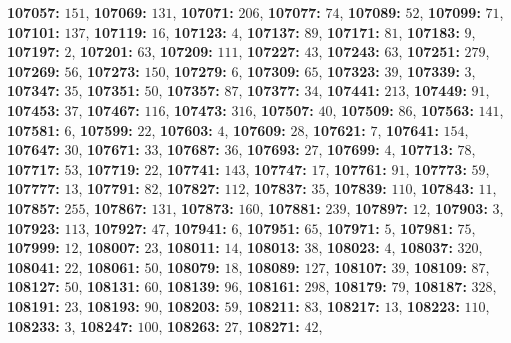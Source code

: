 \textsf{\bfseries 107057:} $151$, \textsf{\bfseries 107069:} $131$, \textsf{\bfseries 107071:} $206$, \textsf{\bfseries 107077:} $74$, \textsf{\bfseries 107089:} $52$, \textsf{\bfseries 107099:} $71$, \textsf{\bfseries 107101:} $137$, \textsf{\bfseries 107119:} $16$, \textsf{\bfseries 107123:} $4$, \textsf{\bfseries 107137:} $89$, \textsf{\bfseries 107171:} $81$, \textsf{\bfseries 107183:} $9$, \textsf{\bfseries 107197:} $2$, \textsf{\bfseries 107201:} $63$, \textsf{\bfseries 107209:} $111$, \textsf{\bfseries 107227:} $43$, \textsf{\bfseries 107243:} $63$, \textsf{\bfseries 107251:} $279$, \textsf{\bfseries 107269:} $56$, \textsf{\bfseries 107273:} $150$, \textsf{\bfseries 107279:} $6$, \textsf{\bfseries 107309:} $65$, \textsf{\bfseries 107323:} $39$, \textsf{\bfseries 107339:} $3$, \textsf{\bfseries 107347:} $35$, \textsf{\bfseries 107351:} $50$, \textsf{\bfseries 107357:} $87$, \textsf{\bfseries 107377:} $34$, \textsf{\bfseries 107441:} $213$, \textsf{\bfseries 107449:} $91$, \textsf{\bfseries 107453:} $37$, \textsf{\bfseries 107467:} $116$, \textsf{\bfseries 107473:} $316$, \textsf{\bfseries 107507:} $40$, \textsf{\bfseries 107509:} $86$, \textsf{\bfseries 107563:} $141$, \textsf{\bfseries 107581:} $6$, \textsf{\bfseries 107599:} $22$, \textsf{\bfseries 107603:} $4$, \textsf{\bfseries 107609:} $28$, \textsf{\bfseries 107621:} $7$, \textsf{\bfseries 107641:} $154$, \textsf{\bfseries 107647:} $30$, \textsf{\bfseries 107671:} $33$, \textsf{\bfseries 107687:} $36$, \textsf{\bfseries 107693:} $27$, \textsf{\bfseries 107699:} $4$, \textsf{\bfseries 107713:} $78$, \textsf{\bfseries 107717:} $53$, \textsf{\bfseries 107719:} $22$, \textsf{\bfseries 107741:} $143$, \textsf{\bfseries 107747:} $17$, \textsf{\bfseries 107761:} $91$, \textsf{\bfseries 107773:} $59$, \textsf{\bfseries 107777:} $13$, \textsf{\bfseries 107791:} $82$, \textsf{\bfseries 107827:} $112$, \textsf{\bfseries 107837:} $35$, \textsf{\bfseries 107839:} $110$, \textsf{\bfseries 107843:} $11$, \textsf{\bfseries 107857:} $255$, \textsf{\bfseries 107867:} $131$, \textsf{\bfseries 107873:} $160$, \textsf{\bfseries 107881:} $239$, \textsf{\bfseries 107897:} $12$, \textsf{\bfseries 107903:} $3$, \textsf{\bfseries 107923:} $113$, \textsf{\bfseries 107927:} $47$, \textsf{\bfseries 107941:} $6$, \textsf{\bfseries 107951:} $65$, \textsf{\bfseries 107971:} $5$, \textsf{\bfseries 107981:} $75$, \textsf{\bfseries 107999:} $12$, \textsf{\bfseries 108007:} $23$, \textsf{\bfseries 108011:} $14$, \textsf{\bfseries 108013:} $38$, \textsf{\bfseries 108023:} $4$, \textsf{\bfseries 108037:} $320$, \textsf{\bfseries 108041:} $22$, \textsf{\bfseries 108061:} $50$, \textsf{\bfseries 108079:} $18$, \textsf{\bfseries 108089:} $127$, \textsf{\bfseries 108107:} $39$, \textsf{\bfseries 108109:} $87$, \textsf{\bfseries 108127:} $50$, \textsf{\bfseries 108131:} $60$, \textsf{\bfseries 108139:} $96$, \textsf{\bfseries 108161:} $298$, \textsf{\bfseries 108179:} $79$, \textsf{\bfseries 108187:} $328$, \textsf{\bfseries 108191:} $23$, \textsf{\bfseries 108193:} $90$, \textsf{\bfseries 108203:} $59$, \textsf{\bfseries 108211:} $83$, \textsf{\bfseries 108217:} $13$, \textsf{\bfseries 108223:} $110$, \textsf{\bfseries 108233:} $3$, \textsf{\bfseries 108247:} $100$, \textsf{\bfseries 108263:} $27$, \textsf{\bfseries 108271:} $42$, 
